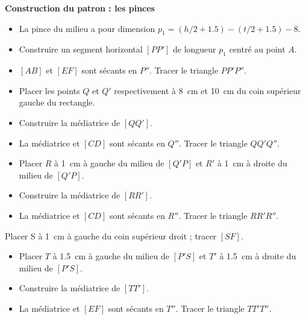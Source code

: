 \documentclass["../Cours.tex"]{subfiles}
\begin{document}
{\begin{questions}
\question \textbf{Construction du patron : les pinces}
    \subquestion 
    \begin{itemize}
        \item La pince du milieu a pour dimension $p_1 = (h/2+\num{1.5})-(t/2+\num{1.5})-8$.
        \item Construire un segment horizontal $[PP']$ de longueur $p_1$ centré au point $A$.
        \item $[AB]$ et $[EF]$ sont sécants en $P''$. Tracer le triangle $PP'P''$.
    \end{itemize} 
    \subquestion 
    \begin{itemize}
        \item Placer les points $Q$ et $Q'$ respectivement à \qty{8}{\cm} et \qty{10}{\cm} du coin supérieur gauche du rectangle. 
        \item Construire la médiatrice de $[QQ']$.
        \item La médiatrice et $[CD]$ sont sécants en $Q''$. Tracer le triangle $QQ'Q''$.
    \end{itemize}
    \subquestion 
    \begin{itemize}
        \item Placer $R$ à \qty{1}{\cm} à gauche du milieu de $[Q'P]$ et $R'$ à \qty{1}{\cm} à droite du milieu de $[Q'P]$.
        \item Construire la médiatrice de $[RR']$.
        \item La médiatrice et $[CD]$ sont sécants en $R''$. Tracer le triangle $RR'R''$.
    \end{itemize}
    \subquestion Placer S à \qty{1}{\cm} à gauche du coin supérieur droit ; tracer $[SF]$.
    \subquestion 
    \begin{itemize}
        \item Placer $T$ à \qty{1.5}{\cm} à gauche du milieu de $[P'S]$ et $T'$ à \qty{1.5}{\cm} à droite du milieu de $[P'S]$.
        \item Construire la médiatrice de $[TT']$.
        \item La médiatrice et $[EF]$ sont sécants en $T''$. Tracer le triangle $TT'T''$.
    \end{itemize}
\end{questions}

}
\end{document}
